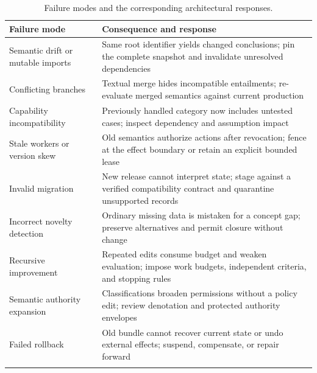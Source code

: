 \documentclass[preprint,12pt,authoryear]{elsarticle}
\begin{document}
\begin{table}[!htbp]\centering\footnotesize
\caption{Failure modes and the corresponding architectural
responses.}
\medskip
\begin{tabular}{@{}
  >{\raggedright\arraybackslash}p{}
  >{\raggedright\arraybackslash}p{}@{}}
\toprule\noalign{}
\begin{minipage}[b]{\linewidth}\raggedright
Failure mode
\end{minipage} & \begin{minipage}[b]{\linewidth}\raggedright
Consequence and response
\end{minipage} \\
\midrule\noalign{}

Semantic drift or mutable imports & Same root identifier yields changed
conclusions; pin the complete snapshot and invalidate unresolved
dependencies \\
\addlinespace[4pt]
Conflicting branches & Textual merge hides incompatible entailments;
re-evaluate merged semantics against current production \\
\addlinespace[4pt]
Capability incompatibility & Previously handled category now includes
untested cases; inspect dependency and assumption impact \\
\addlinespace[4pt]
Stale workers or version skew & Old semantics authorize actions after
revocation; fence at the effect boundary or retain an explicit bounded
lease \\
\addlinespace[4pt]
Invalid migration & New release cannot interpret state; stage against a
verified compatibility contract and quarantine unsupported records \\
\addlinespace[4pt]
Incorrect novelty detection & Ordinary missing data is mistaken for a
concept gap; preserve alternatives and permit closure without change \\
\addlinespace[4pt]
Recursive improvement & Repeated edits consume budget and weaken
evaluation; impose work budgets, independent criteria, and stopping
rules \\
\addlinespace[4pt]
Semantic authority expansion & Classifications broaden permissions
without a policy edit; review denotation and protected authority
envelopes \\
\addlinespace[4pt]
Failed rollback & Old bundle cannot recover current state or undo
external effects; suspend, compensate, or repair forward \\
\addlinespace[4pt]

\end{tabular}
\end{table}
\end{document}

